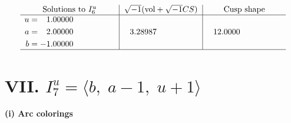 \documentclass[1p]{elsarticle_modified}
\theoremstyle{definition}
\newcommand{\I}{\sqrt{-1}}
\begin{document}
$$\begin{array}{c|c|c}  
\text{Solutions to }I^u_{6}& \I (\text{vol} + \sqrt{-1}CS) & \text{Cusp shape}\\
 \hline 
\begin{aligned}
u &= \phantom{-}1.00000\phantom{ +0.000000I} \\
a &= \phantom{-}2.00000\phantom{ +0.000000I} \\
b &= -1.00000\phantom{ +0.000000I}\end{aligned}
 & \phantom{-}3.28987\phantom{ +0.000000I} & \phantom{-}12.0000\phantom{ +0.000000I}\\
 \hline 
 \end{array}$$\newpage\newpage\renewcommand{\arraystretch}{1}
\centering \section*{VII. $I^u_{7}= \langle b,\;a-1,\;u+1 \rangle$}
\flushleft \textbf{(i) Arc colorings}\\
\end{document}
